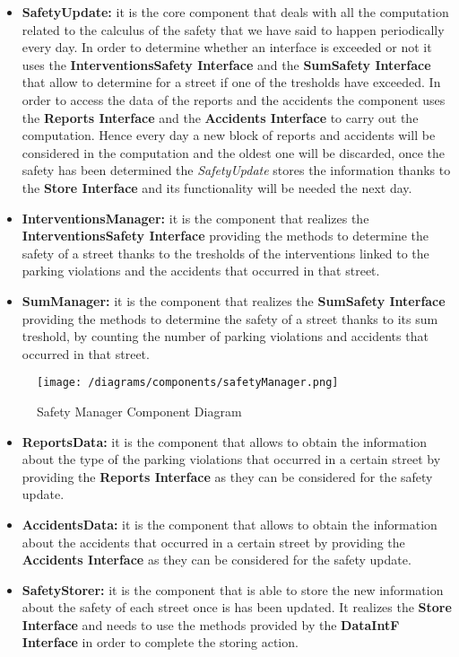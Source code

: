 			\begin{itemize}
				\item \textbf{SafetyUpdate:} it is the core component that deals with all the computation related to the calculus of the safety that we have said to happen periodically every day. In order to determine whether an interface is exceeded or not it uses the \textbf{InterventionsSafety Interface} and the \textbf{SumSafety Interface} that allow to determine for a street if one of the tresholds have exceeded. In order to access the data of the reports and the accidents the component uses the \textbf{Reports Interface} and the \textbf{Accidents Interface} to carry out the computation. Hence every day a new block of reports and accidents will be considered in the computation and the oldest one will be discarded, once the safety has been determined the \emph{SafetyUpdate} stores the information thanks to the \textbf{Store Interface} and its functionality will be needed the next day.
				
				\item \textbf{InterventionsManager:} it is the component that realizes the \textbf{InterventionsSafety Interface} providing the methods to determine the safety of a street thanks to the tresholds of the interventions linked to the parking violations and the accidents that occurred in that street.
				
				\item \textbf{SumManager:} it is the component that realizes the \textbf{SumSafety Interface} providing the methods to determine the safety of a street thanks to its sum treshold, by counting the number of parking violations and accidents that occurred in that street.
			\end{itemize}
		
			\begin{figure}[ht]
				\centering
				\texttt{[image: /diagrams/components/safetyManager.png]}
				\caption{\label{fig:safetyManagerComp} Safety Manager Component Diagram}
			\end{figure}
		
			\begin{itemize}
				\item \textbf{ReportsData:} it is the component that allows to obtain the information about the type of the parking violations that occurred in a certain street by providing the \textbf{Reports Interface} as they can be considered for the safety update.
				
				\item \textbf{AccidentsData:} it is the component that allows to obtain the information about the accidents that occurred in a certain street by providing the \textbf{Accidents Interface} as they can be considered for the safety update.
				
				\item \textbf{SafetyStorer:} it is the component that is able to store the new information about the safety of each street once is has been updated. It realizes the \textbf{Store Interface} and needs to use the methods provided by the \textbf{DataIntF Interface} in order to complete the storing action.
			\end{itemize}
		
